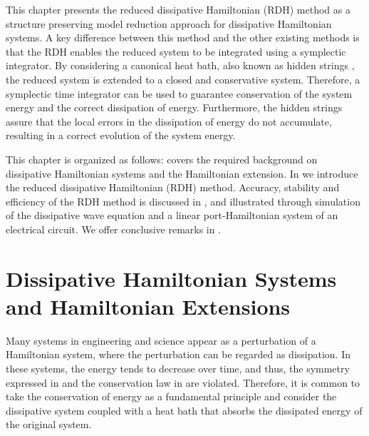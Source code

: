 This chapter presents the reduced dissipative Hamiltonian (RDH) method as a structure preserving model reduction approach for dissipative Hamiltonian systems. A key difference between this method and the other existing methods is that the RDH enables the reduced system to be integrated using a symplectic integrator. By considering a canonical heat bath, also known as hidden strings \cite{figotin2007hamiltonian,figotin2005spectral}, the reduced system is extended to a closed and conservative system. Therefore, a symplectic time integrator can be used to guarantee conservation of the system energy and the correct dissipation of energy. Furthermore, the hidden strings assure that the local errors in the dissipation of energy do not accumulate, resulting in a correct evolution of the system energy.  

This chapter is organized as follows:  covers the required background on dissipative Hamiltonian systems and the Hamiltonian extension. In  we introduce the reduced dissipative Hamiltonian (RDH) method. Accuracy, stability and efficiency of the RDH method is discussed in , and illustrated through simulation of the dissipative wave equation and a linear port-Hamiltonian system of an electrical circuit. We offer conclusive remarks in .


\section{Dissipative Hamiltonian Systems and Hamiltonian Extensions} \label{p3.sec:2}

Many systems in engineering and science appear as a perturbation of a Hamiltonian system, where the perturbation can be regarded as dissipation. In these systems, the energy tends to decrease over time, and thus, the symmetry expressed in  and the conservation law in  are violated. Therefore, it is common to take the conservation of energy as a fundamental principle and consider the dissipative system coupled with a heat bath that absorbs the dissipated energy of the original system. 

